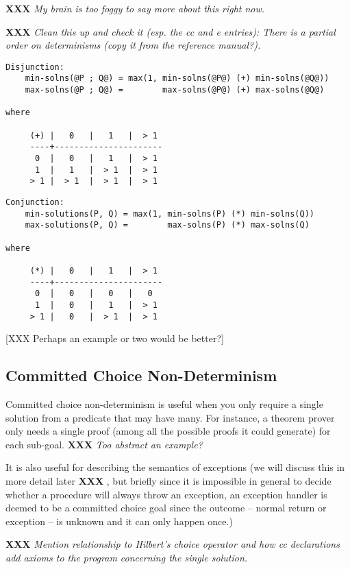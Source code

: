 \documentclass[a4paper,11pt,notitlepage,onecolumn]{article}
\newcommand{\XXX}[1]%
{{\small\textbf{XXX} \emph{#1}}}
\begin{document}
\XXX{My brain is too foggy to say more about this right
now.}

\XXX{Clean this up and check it (esp. the cc and e entries):
There is a partial order on determinisms (copy it from the
reference manual?).}

\begin{verbatim}
Disjunction:
    min-solns(@P ; Q@) = max(1, min-solns(@P@) (+) min-solns(@Q@))
    max-solns(@P ; Q@) =        max-solns(@P@) (+) max-solns(@Q@)

where

     (+) |   0   |   1   |  > 1
     ----+----------------------
      0  |   0   |   1   |  > 1
      1  |   1   |  > 1  |  > 1
     > 1 |  > 1  |  > 1  |  > 1
\end{verbatim}

\begin{verbatim}
Conjunction:
    min-solutions(P, Q) = max(1, min-solns(P) (*) min-solns(Q))
    max-solutions(P, Q) =        max-solns(P) (*) max-solns(Q)

where

     (*) |   0   |   1   |  > 1
     ----+----------------------
      0  |   0   |   0   |   0
      1  |   0   |   1   |  > 1
     > 1 |   0   |  > 1  |  > 1
\end{verbatim}

[XXX Perhaps an example or two would be better?]

\subsection{Committed Choice Non-Determinism}

Committed choice non-determinism is useful when you only
require a single solution from a predicate that may have many.
For instance, a theorem prover only needs a single proof
(among all the possible proofs it could generate) for each
sub-goal. \XXX{Too abstract an example?}

It is also useful for describing the semantics of exceptions
(we will discuss this in more detail later \XXX{}, but briefly
since it is impossible in general to decide whether a
procedure will always throw an exception, an exception handler
is deemed to be a committed choice goal since the outcome --
normal return or exception -- is unknown and it can only happen
once.)

\XXX{Mention relationship to Hilbert's choice operator and how cc
declarations add axioms to the program concerning the single
solution.}
\end{document}

